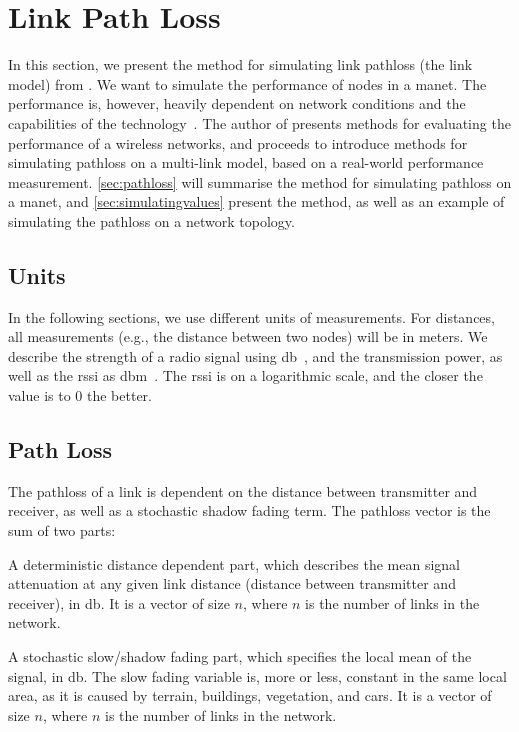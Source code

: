 \section{Link Path Loss}\label{sec:linkmodel}
In this section, we present the method for simulating link \gls{pathloss} (the link model) from \cite{paper:linkmodel}. We want to simulate the performance of nodes in a \gls{manet}. The performance is, however, heavily dependent on network conditions and the capabilities of the technology~\cite[p.~10]{paper:linkmodel}. The author of \cite{paper:linkmodel} presents methods for evaluating the performance of a wireless networks, and proceeds to introduce methods for simulating \gls{pathloss} on a multi-link model, based on a real-world performance measurement. \autoref{sec:pathloss} will summarise the method for simulating \gls{pathloss} on a \gls{manet}, and \autoref{sec:simulatingvalues} present the method, as well as an example of simulating the \gls{pathloss} on a network topology.%

\subsection{Units}
In the following sections, we use different units of measurements. For distances, all measurements (e.g., the distance between two nodes) will be in meters. We describe the strength of a radio signal using \acrshort{db}~\cite{website:isadbdbm}, and the transmission power, as well as the \gls{rssi} as \acrshort{dbm}~\cite{website:isadbdbm}. The \gls{rssi} is on a logarithmic scale, and the closer the value is to 0 the better.

\subsection{Path Loss}\label{sec:pathloss}
The \gls{pathloss} of a link is dependent on the distance between transmitter and receiver, as well as a stochastic shadow fading term. The \gls{pathloss} vector  is the sum of two parts:

\begin{description}[style=nextline]
    \item[$\vect{l_d}$] A deterministic distance dependent part, which describes the mean signal attenuation at any given link distance (distance between transmitter and receiver), in \gls{db}. It is a vector of size $n$, where $n$ is the number of links in the network.
    \item[$\vect{l_{fading}}$] A stochastic slow/shadow fading part, which specifies the local mean of the signal, in \gls{db}. The slow fading variable is, more or less, constant in the same local area, as it is caused by terrain, buildings, vegetation, and cars. It is a vector of size $n$, where $n$ is the number of links in the network.
\end{description}

